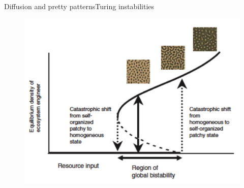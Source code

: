 \documentclass{eecslides}
\begin{document}
	
	\begin{frame}[fragile]{Diffusion and pretty patterns}{Turing instabilities}

		\begin{figure}[!t]
			\includegraphics[height=0.75\textheight]{rietkerk2}
		\end{figure}

	\end{frame}

	
\end{document}
